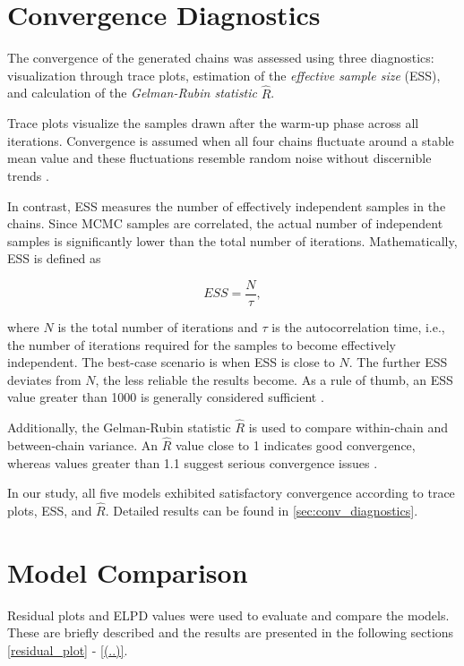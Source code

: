 \documentclass[12pt]{article}
\begin{document}
\section{Convergence Diagnostics}

The convergence of the generated chains was assessed using three diagnostics: visualization through trace plots, estimation of the \textit{effective sample size} (ESS), and calculation of the \textit{Gelman-Rubin statistic} $\hat{R}$. 

Trace plots visualize the samples drawn after the warm-up phase across all iterations. Convergence is assumed when all four chains fluctuate around a stable mean value and these fluctuations resemble random noise without discernible trends \parencite{gelman2013bayesian}. 

In contrast, ESS measures the number of effectively independent samples in the chains. Since MCMC samples are correlated, the actual number of independent samples is significantly lower than the total number of iterations. Mathematically, ESS is defined as  

\[
ESS = \frac{N}{\tau},
\]

where $N$ is the total number of iterations and $\tau$ is the autocorrelation time, i.e., the number of iterations required for the samples to become effectively independent. The best-case scenario is when ESS is close to $N$. The further ESS deviates from $N$, the less reliable the results become. As a rule of thumb, an ESS value greater than 1000 is generally considered sufficient \parencite{bayestestR_ess}.  

Additionally, the Gelman-Rubin statistic $\hat{R}$ is used to compare within-chain and between-chain variance. An $\hat{R}$ value close to 1 indicates good convergence, whereas values greater than 1.1 suggest serious convergence issues \parencite{vehtari2021rhat}.  

In our study, all five models exhibited satisfactory convergence according to trace plots, ESS, and $\hat{R}$. Detailed results can be found in \autoref{sec:conv_diagnostics}.  


\section{Model Comparison}

Residual plots and ELPD values were used to evaluate and compare the models. These are briefly described and the results are presented in the following sections \ref{residual_plot} - \ref{(..)}.
\end{document}
